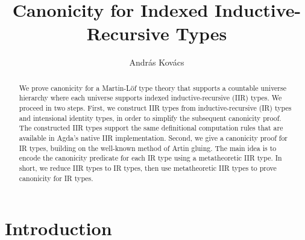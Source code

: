 \documentclass[acmsmall,screen,review,anonymous]{acmart}
\begin{document}
\title{Canonicity for Indexed Inductive-Recursive Types}

\author{András Kovács}


\begin{abstract}
We prove canonicity for a Martin-Löf type theory that supports a countable universe hierarchy where
each universe supports indexed inductive-recursive (IIR) types. We proceed in two steps. First, we
construct IIR types from inductive-recursive (IR) types and intensional identity types, in order to
simplify the subsequent canonicity proof. The constructed IIR types support the same definitional
computation rules that are available in Agda's native IIR implementation. Second, we give a
canonicity proof for IR types, building on the well-known method of Artin gluing. The main idea is
to encode the canonicity predicate for each IR type using a metatheoretic IIR type. In short, we reduce IIR types to IR types, then use metatheoretic IIR types to prove canonicity for IR types.
\end{abstract}


\maketitle

\section{Introduction}\label{sec:introduction}
\end{document}
